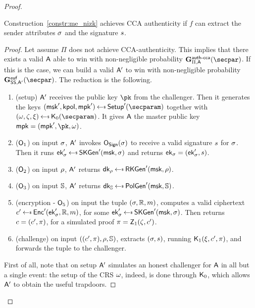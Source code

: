 \begin{proof}
    \begin{lemma}\label{lemma:me_auth}
        Construction~\ref{constr:me_nizk} achieves CCA authenticity if $f$ can extract the sender attributes $\sigma$ and the signature $s$.
        \begin{proof}
            Let assume $\Pi$ does not achieve CCA-authenticity.
            This implies that there exists a valid $\mathsf{A}$ able to win with non-negligible probability $\NISHeufgamecca{}_{\Pi, \adversary}(\secpar)$.
            If this is the case, we can build a valid $\mathsf{A}'$ to win with non-negligible probability $\Sigeufgame_{\sig, \adversary'}(\secpar)$.
            The reduction is the following.

            \begin{enumerate}
                \item (setup) $\mathsf{A}'$ receives the public key $\pk$ from the challenger. Then it generates the keys $(\msk', \kpol, \mpk') \getsr \setup'(\secparam)$ together with $(\crs,\tpsim,\tpext)\getsr\nizkext_0(\secparam)$. It gives $\mathsf{A}$ the master public key $\mpk = (\mpk', \pk, \crs)$.
                \item ($\mathsf{O}_1$) on input $\sigma$, $\mathsf{A}'$ invokes $\mathsf{O}_{\mathsf{Sign}}(\sigma)$ to receive a valid signature $s$ for $\sigma$. Then it runs $\ek'_\sattr \getsr \skgen'(\msk, \sattr)$ and returns $\mathsf{ek}_\sigma = (\mathsf{ek}_\sigma', s)$.
                \item ($\mathsf{O}_2$) on input $\rho$, $\mathsf{A}'$ returns $\dk_\rattr \getsr \rkgen'(\msk, \rattr)$.
                \item ($\mathsf{O}_3$) on input $\mathbb{S}$, $\mathsf{A}'$ returns $\dk_\saccess \getsr \polgen'(\msk, \saccess)$.
                \item (encryption - $\mathsf{O}_5$) on input the tuple $(\sigma, \mathbb{R}, m)$, computes a valid ciphertext $\cipher' \getsr \enc'(\ek'_\sattr, \raccess, \msg)$, for some $\ek'_\sattr \getsr \skgen'(\msk, \sattr)$. Then returns $c = (c', \pi)$, for a simulated proof $\pi = \mathsf{Z}_1(\zeta, c')$.
                \item (challenge) on input $((c', \pi), \rho, \mathbb{S})$, extracts $(\sigma, s)$, running $\mathsf{K}_1(\xi, c', \pi)$, and forwards the tuple to the challenger.
            \end{enumerate}
            First of all, note that on setup $\mathsf{A}'$ simulates an honest challenger for $\mathsf{A}$ in all but a single event: the setup of the CRS $\omega$, indeed, is done through $\mathsf{K}_0$, which allows $\mathsf{A}'$ to obtain the useful trapdoors.

\end{proof}
\end{lemma}
\end{proof}
